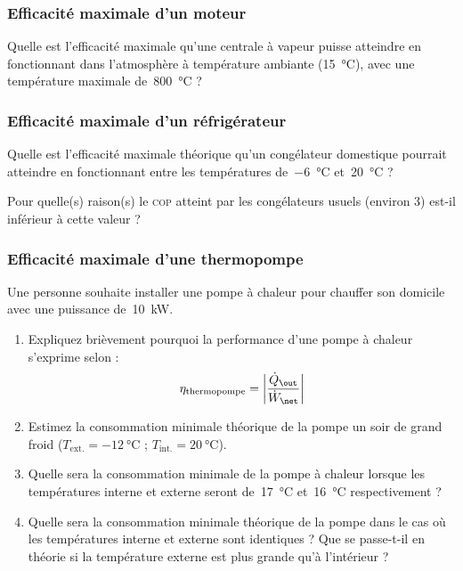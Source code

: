 \begin{boiboiboite}
	\propeau
	\propair
	\isentropiques
	\isothermes
	\efficacitescarnot
\end{boiboiboite}


\subsubsection{Efficacité maximale d’un moteur}
\label{exo_efficacite_moteur_carnot}

	Quelle est l’efficacité maximale qu’une centrale à vapeur puisse atteindre en fonctionnant dans l’atmosphère à température ambiante (\SI{15}{\degreeCelsius}), avec une température maximale de~\SI{800}{\degreeCelsius} ?

\subsubsection{Efficacité maximale d’un réfrigérateur}
\label{exo_efficacite_refrigerateur_carnot}

	Quelle est l’efficacité maximale théorique qu’un congélateur domestique pourrait atteindre en fonctionnant entre les températures de~\SI{-6}{\degreeCelsius} et~\SI{20}{\degreeCelsius} ?
	
	Pour quelle(s) raison(s) le \textsc{cop} atteint par les congélateurs usuels (environ \num{3}) est-il inférieur à cette valeur ?
	
\subsubsection{Efficacité maximale d’une thermopompe}
\label{exo_efficacite_thermopompe_carnot}

	Une personne souhaite installer une pompe à chaleur pour chauffer son domicile avec une puissance de~\SI{10}{\kilo\watt}.

	\begin{enumerate}
	
		\item Expliquez brièvement pourquoi la performance d’une pompe à chaleur s’exprime selon :
			\begin{equation}
				\eta_\text{thermopompe} = \left| \frac{\dot Q_\out}{\dot W_\net} \right|
			\end{equation}

		\item Estimez la consommation minimale théorique de la pompe un soir de grand froid ($T_\text{ext.} = \SI{-12}{\degreeCelsius}$ ; $T_\text{int.} = \SI{20}{\degreeCelsius}$).
		
		\item Quelle sera la consommation minimale de la pompe à chaleur lorsque les températures interne et externe seront de~\SI{17}{\degreeCelsius}  et~\SI{16}{\degreeCelsius} respectivement ?
		
		\item Quelle sera la consommation minimale théorique de la pompe dans le cas où les températures interne et externe sont identiques ?  Que se passe-t-il en théorie si la température externe est plus grande qu’à l’intérieur ?

	\end{enumerate}


